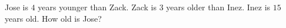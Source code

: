 Jose is $4$ years younger than Zack. Zack is $3$ years older than Inez. Inez is $15$ years old. How old is Jose?

